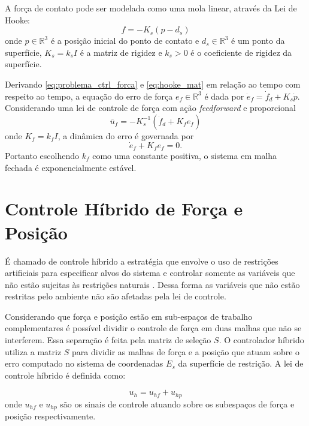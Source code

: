 A força de contato pode ser modelada como uma mola linear, através da Lei de Hooke:
\begin{equation} \label{eq:hooke_mat}
{f} = -{K}_s ({p} - {d}_s)
\end{equation}
onde ${p} \in \mathbb{R}^3$ é a posição inicial do ponto de contato e ${d}_s \in \mathbb{R}^3$ é um ponto da superfície, ${K}_s = k_s I$ é a matriz de rigidez e $k_s > 0$ é o coeficiente de rigidez da superfície.

Derivando \eqref{eq:problema_ctrl_forca} e \eqref{eq:hooke_mat} em relação ao tempo com respeito ao tempo, a equação do erro de força $e_f \in \mathbb{R}^3$ é dada por $\dot{{e}}_f = \dot{{f}}_d + {K}_s \dot{{p}}$. Considerando uma lei de controle de força com ação \textit{feedforward} e proporcional
\begin{equation}
{\bar{u}}_f = -{K}_s^{-1} (\dot{{f}}_d + {K}_f {e}_f)
\end{equation}
onde ${K}_f = k_f {I}$, a dinâmica do erro é governada por
\begin{equation}
\dot{{e}}_f + {K}_f {e}_f = 0.
\end{equation}
Portanto escolhendo $k_f$ como uma constante positiva, o sistema em malha fechada é exponencialmente estável. 

\section{Controle Híbrido de Força e Posição}

É chamado de controle híbrido a estratégia que envolve o uso de restrições artificiais para especificar alvos do sistema e controlar somente as variáveis que não estão sujeitas às restrições naturais \citep{xaud2016doris}. Dessa forma as variáveis que não estão restritas pelo ambiente não são afetadas pela lei de controle.

Considerando que força e posição estão em sub-espaços de trabalho complementares é possível dividir o controle de força em duas malhas que não se interferem. Essa separação é feita pela matriz de seleção ${S}$. O controlador híbrido utiliza a matriz ${S}$ para dividir as malhas de  força e a posição  que atuam sobre o erro computado no sistema de coordenadas ${E}_s$ da superfície de restrição. A lei de controle híbrido é definida como:

\begin{equation} \label{eq:ctrl_law}
{u}_h = {u}_{hf} + {u}_{hp}
\end{equation}
onde $u_{hf}$ e $u_{hp}$ são os sinais de controle atuando sobre os subespaços de força e posição respectivamente. 

